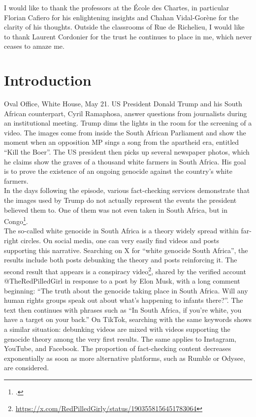 \documentclass[a4paper,twoside,12pt]{book}
\begin{document}
	\bigskip %
I would like to thank the professors at the École des Chartes, in particular Florian Cafiero for his enlightening insights and Chahan Vidal-Gorène for the clarity of his thoughts. Outside the classrooms of Rue de Richelieu, I would like to thank Laurent Cordonier for the trust he continues to place in me, which never ceases to amaze me.
	
	
	\clearpage
	\thispagestyle{empty}
	\cleardoublepage
	
	\chapter*{Introduction}
	 \label{intro}
	
	Oval Office, White House, May 21. US President Donald Trump and his South African counterpart, Cyril Ramaphosa, answer questions from journalists during an institutional meeting. Trump dims the lights in the room for the screening of a video. The images come from inside the South African Parliament and show the moment when an opposition MP sings a song from the apartheid era, entitled \enquote{Kill the Boer}. The US president then picks up several newspaper photos, which he claims show the graves of a thousand white farmers in South Africa. His goal is to prove the existence of an ongoing genocide against the country's white farmers. \\
	In the days following the episode, various fact-checking services demonstrate that the images used by Trump do not actually represent the events the president believed them to. One of them was not even taken in South Africa, but in Congo\footcite{BBC-2025}. \\
	The so-called white genocide in South Africa is a theory widely spread within far-right circles. On social media, one can very easily find videos and posts supporting this narrative. Searching on X for \enquote{white genocide South Africa}, the results include both posts debunking the theory and posts reinforcing it. The second result that appears is a conspiracy video\footnote{\url{https://x.com/RedPilledGirly/status/1903558156451783064}}, shared by the verified account @TheRedPilledGirl in response to a post by Elon Musk, with a long comment beginning: \enquote{The truth about the genocide taking place in South Africa. Will any human rights groups speak out about what’s happening to infants there?}. The text then continues with phrases such as \enquote{In South Africa, if you're white, you have a target on your back.} On TikTok, searching with the same keywords shows a similar situation: debunking videos are mixed with videos supporting the genocide theory among the very first results. The same applies to Instagram, YouTube, and Facebook. The proportion of fact-checking content decreases exponentially as soon as more alternative platforms, such as Rumble or Odysee, are considered. \\
	
\end{document}
